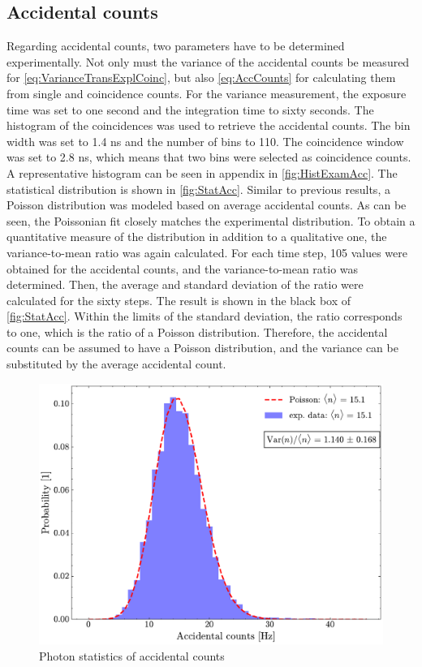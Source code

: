 \subsection{Accidental counts}
Regarding accidental counts, two parameters have to be determined experimentally.
Not only must the variance of the accidental counts be measured for \autoref{eq:VarianceTransExplCoinc}, but also \autoref{eq:AccCounts} for calculating them from single and coincidence counts. \newline
For the variance measurement, the exposure time was set to one second and the integration time to sixty seconds.
The histogram of the coincidences was used to retrieve the accidental counts. The bin width was set to 1.4 ns and the number of bins to 110. The coincidence window was set to 2.8 ns, which means that two bins were selected as coincidence counts. A representative histogram can be seen in appendix in \autoref{fig:HistExamAcc}.
\newline
The statistical distribution is shown in \autoref{fig:StatAcc}. Similar to previous results, a Poisson distribution was modeled based on average accidental counts. As can be seen, the Poissonian fit closely matches the experimental distribution. \newline
To obtain a quantitative measure of the distribution in addition to a qualitative one, the variance-to-mean ratio was again calculated. For each time step, 105 values were obtained for the accidental counts, and the variance-to-mean ratio was determined. Then, the average and standard deviation of the ratio were calculated for the sixty steps. The result is shown in the black box of \autoref{fig:StatAcc}. \newline
Within the limits of the standard deviation, the ratio corresponds to one, which is the ratio of a Poisson distribution. Therefore, the accidental counts can be assumed to have a Poisson distribution, and the variance can be substituted by the average accidental count.
\begin{figure}[tb!]
	\centering
	\includegraphics[width=.7\textwidth]{Images/AccCountsStatistics.pdf}
	\caption{Photon statistics of accidental counts}
	\label{fig:StatAcc}
\end{figure} \newline
